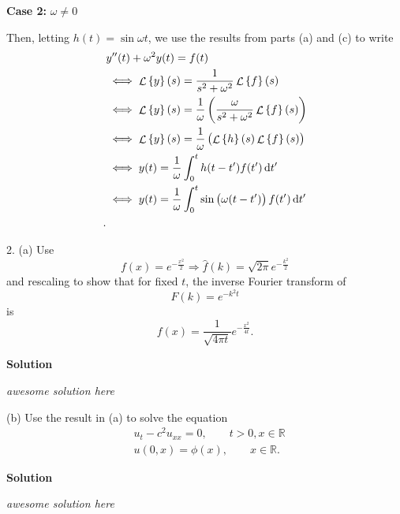 \documentclass{article}
\DeclareMathOperator{\Lagr}{\mathcal{L}}
\begin{document}
\textbf{Case 2:} $\omega \neq 0$

Then, letting $h(t) = \sin \omega t$, we use the results from parts (a)
and (c) to write
%
\begin{align*}
    &y^{\prime \prime}(t) + \omega^2 y(t) = f(t) \\
    &\iff \Lagr \cbr{y}(s) = \frac{1}{s^2 + \omega^2} \Lagr \cbr{f}(s) \\
    &\iff \Lagr \cbr{y}(s) = \frac{1}{\omega} \del{\frac{\omega}{s^2 + \omega^2} \Lagr \cbr{f}(s)} \\
    &\iff \Lagr \cbr{y}(s) = \frac{1}{\omega} \del{\Lagr \cbr{h}(s) \Lagr \cbr{f}(s)} \\
    &\iff y(t) = \frac{1}{\omega} \int_0^t h(t - t^\prime) f(t^\prime) \dif t^\prime \\
    &\iff y(t) = \frac{1}{\omega} \int_0^t \sin \del{\omega (t - t^\prime)} f(t^\prime) \dif t^\prime \\
    .
\end{align*}

\newpage

2. (a) Use
%
\begin{equation*}
    f(x) = e^{- \frac{x^2}{2}} \Rightarrow \widehat{f}(k) = \sqrt{2 \pi} e^{- \frac{k^2}{2}}
\end{equation*}
%
and rescaling to show that for fixed $t$, the inverse Fourier transform of
%
\begin{equation*}
    F(k) = e^{- k^2 t}
\end{equation*}
%
is
%
\begin{equation*}
    f(x) = \frac{1}{\sqrt{4 \pi t}} e^{- \frac{x^2}{4 t}}
    .
\end{equation*}

\textbf{Solution}

\textit{awesome solution here}

\vspace{5mm}

(b) Use the result in (a) to solve the equation
%
\begin{align*}
    &u_t - c^2 u_{x x} = 0, \quad \quad t > 0, x \in \mathbb{R} \\
    &u(0, x) = \phi(x), \quad \quad x \in \mathbb{R}
    .
\end{align*}

\textbf{Solution}

\textit{awesome solution here}
\end{document}

